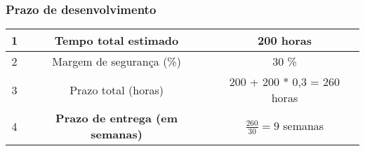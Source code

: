             \subsubsection*{Prazo de desenvolvimento}
            
                \begin{center}
                    
                    \begin{tabular}{| c | c | c |} \hline
                         1 & Tempo total estimado & 200 horas \\ \hline
                         2 & Margem de segurança (\%) & 30 \% \\ \hline
                         3 & Prazo total (horas) & 200 + 200 * 0,3 = 260 horas  \\ \hline
                         4 & \textbf{Prazo de entrega (em semanas)} & $\frac{260}{30} = 9$ semanas \\ \hline
                    \end{tabular}
                    
                    
                \end{center}